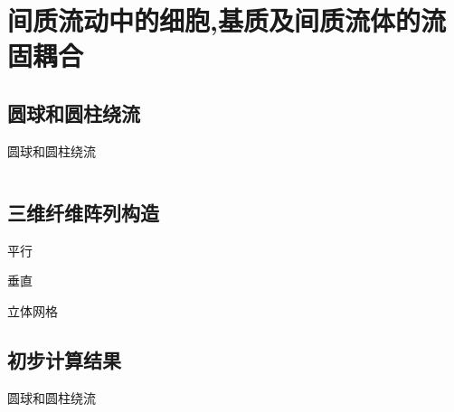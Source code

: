 \section{间质流动中的细胞,基质及间质流体的流固耦合}
\subsection{圆球和圆柱绕流}
\begin{frame}{圆球和圆柱绕流}
\begin{columns}
\begin{column}[c]{0.5\textwidth}
\begin{center}

\end{center}
\end{column}
\begin{column}[c]{0.5\textwidth}
\begin{center}

\end{center}
\end{column}
\end{columns}
\end{frame}

\subsection{三维纤维阵列构造}
\begin{frame}{平行}
\end{frame}
\begin{frame}{垂直}
\end{frame}
\begin{frame}{立体网格}
\end{frame}

\subsection{初步计算结果}
\begin{frame}{圆球和圆柱绕流}
\begin{columns}
\begin{column}[c]{0.5\textwidth}
\begin{center}

\end{center}
\end{column}
\begin{column}[c]{0.5\textwidth}
\begin{center}

\end{center}
\end{column}
\end{columns}
\end{frame}

